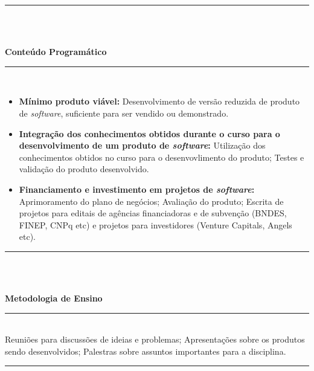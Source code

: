 \noindent\rule{16.5cm}{0.4pt}\\
\\
\vspace{-12mm}
\begin{center}\textbf{Conteúdo Programático}\end{center}
\vspace{-5mm}
\noindent\rule{16.5cm}{0.4pt}
\\
\begin{itemize}

 \item \textbf{M\'inimo produto vi\'avel:} Desenvolvimento de vers\~ao reduzida de produto de \textit{software}, suficiente para ser vendido ou demonstrado.


 \item \textbf{Integra\c{c}\~ao dos conhecimentos obtidos durante o curso para o desenvolvimento de um produto de \textit{software}:} Utiliza\c{c}\~ao dos conhecimentos obtidos no curso para o desenvovlimento do produto; Testes e valida\c{c}\~ao do produto desenvolvido.

 \item \textbf{Financiamento e investimento em projetos de \textit{software}:} Aprimoramento do plano de neg\'ocios; Avalia\c{c}\~ao do produto; Escrita de projetos para editais de agências financiadoras e de subvenção (BNDES, FINEP, CNPq etc) e projetos para investidores (Venture Capitals, Angels etc).

\end{itemize}
\noindent\rule{16.5cm}{0.4pt}\\
\\
\vspace{-12mm}
\begin{center}\textbf{Metodologia de Ensino}\end{center} 
\vspace{-5mm}
\noindent\rule{16.5cm}{0.4pt}
\\
   Reuni\~oes para discuss\~oes de ideias e problemas; Apresenta\c{c}\~oes sobre os produtos sendo desenvolvidos; Palestras sobre assuntos importantes para a disciplina.\\
\noindent\rule{16.5cm}{0.4pt}\\
